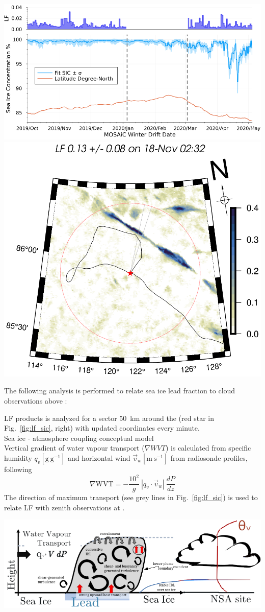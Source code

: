 \documentclass[portrate,a0paper,fontscale=0.45,margin=1cm]{baposter}
\begin{document}
\begin{poster}
{\begin{minipage}{0.99\textwidth}
	\centering
		\includegraphics[width=.61\linewidth]{bias_sic_timeseries.png}\hfill
		\includegraphics[width=.35\linewidth]{mosaic0152_20191115T03271573_20191118T05301574_LF.png}
	\captionsetup{width=0.8\linewidth}
	\label{fig:lf_sic}
\end{minipage}

The following analysis is performed to relate sea ice lead fraction to cloud observations above \polarstern:

\colouredcircle LF products is analyzed for a sector 50~km around the \polarstern (red star in Fig.~\ref{fig:lf_sic}, right) with updated coordinates every minute.\\

\colouredcircle Sea ice - atmosphere coupling conceptual model\\
Vertical gradient of water vapour transport ($\nabla WVT$) is calculated from specific humidity $q_v \mathrm{[g~g^{-1}]}$ and horizontal wind $\vec{v}_w \mathrm{[m~s^{-1}]}$ from radiosonde profiles, following
\begin{equation}
	\nabla \mathrm{WVT} = -\frac{10^2}{g}~|q_v\cdot \vec{v}_w|~\frac{dP}{dz}
\end{equation}
The direction of maximum transport (see grey lines in Fig.~\ref{fig:lf_sic}) is used to relate LF with zenith observations at \polarstern.
\begin{minipage}{0.9\textwidth}
	\centering
		\includegraphics[width=.6\linewidth]{drawing_lead_cloud.png}
	\label{fig:leadcloud}
\end{minipage}\\

}
\end{poster}
\end{document}
